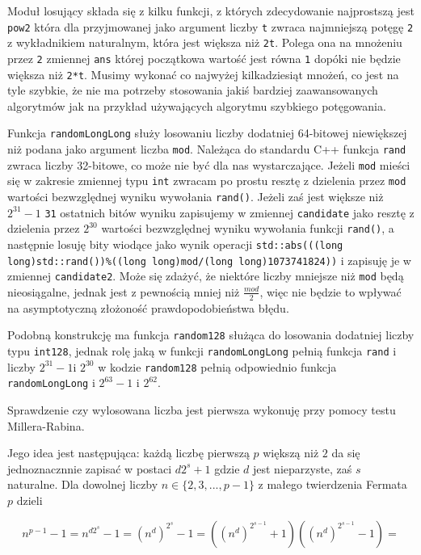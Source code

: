 \documentclass{article}
\begin{document}
Moduł losujący składa się z kilku funkcji, z których zdecydowanie najprostszą jest \texttt{pow2} która dla przyjmowanej jako argument liczby \texttt{t}
zwraca najmniejszą potęgę \texttt{2} z wykładnikiem naturalnym, która jest większa niż \texttt{2t}. Polega ona na
mnożeniu przez \texttt{2} zmiennej \texttt{ans} której początkowa wartość jest równa \texttt{1} dopóki nie będzie 
większa niż \texttt{2*t}. Musimy wykonać co najwyżej kilkadziesiąt mnożeń, co jest na tyle szybkie, że nie ma 
potrzeby stosowania jakiś bardziej zaawansowanych algorytmów jak na przykład 
używających algorytmu szybkiego potęgowania.

Funkcja \texttt{randomLongLong} służy losowaniu liczby dodatniej 64-bitowej niewiększej niż podana jako argument 
liczba \texttt{mod}. Należąca do standardu C++ funkcja \texttt{rand} zwraca liczby 32-bitowe, co może nie być dla nas
wystarczające. Jeżeli \texttt{mod} mieści się w zakresie zmiennej typu \texttt{int} zwracam po prostu resztę z dzielenia przez \texttt{mod} wartości bezwzględnej
wyniku wywołania \texttt{rand()}. Jeżeli zaś jest większe niż $2^{31}-1$ \texttt{31} ostatnich bitów wyniku zapisujemy w zmiennej \texttt{candidate} jako resztę z dzielenia przez $2^{30}$ wartości bezwzględnej wyniku wywołania funkcji \texttt{rand()},
a następnie losuję bity wiodące jako wynik  operacji \texttt{std::abs(((long long)std::rand())\%((long long)mod/(long long)1073741824))} i zapisuję je w zmiennej \texttt{candidate2}. Może się zdażyć, że niektóre liczby mniejsze niż 
\texttt{mod} będą nieosiągalne, jednak jest z pewnością mniej niż $\frac{mod}{2}$, więc nie będzie to wpływać na 
asymptotyczną złożoność prawdopodobieństwa błędu. 

Podobną konstrukcję ma funkcja \texttt{random128} służąca do losowania dodatniej liczby typu
\texttt{\textunderscore \textunderscore int128},
jednak rolę jaką w funkcji \texttt{randomLongLong} pełnią funkcja \texttt{rand} i liczby $2^{31}-1$i $2^{30}$ w kodzie \texttt{random128} pełnią odpowiednio
 funkcja \texttt{randomLongLong} i $2^{63}-1$ i $2^{62}$.

Sprawdzenie czy wylosowana liczba jest pierwsza wykonuję przy pomocy testu Millera-Rabina. 

Jego idea jest następująca: każdą liczbę pierwszą $p$ większą niż $2$ da się jednoznacznnie zapisać w postaci $d2^s+1$
gdzie $d$ jest nieparzyste, zaś $s$ naturalne. Dla dowolnej liczby
$n \in \{2,3,...,p-1\}$ z małego twierdzenia Fermata $p$ dzieli

$$ n^{p-1}-1=n^{d2^s}-1=(n^d)^{2^s}-1=((n^d)^{2^{s-1}}+1)((n^d)^{2^{s-1}}-1)=$$
\end{document}
